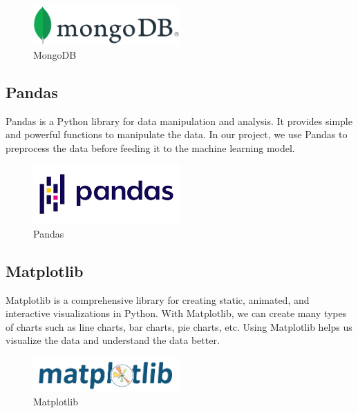 \begin{figure}[ht]
    \centering
    \includegraphics[width=0.5\textwidth]{../Images/8.Technology_Stack/mongodb_logo.png}
    \caption{MongoDB}
    \label{fig:mongodb}
\end{figure}


\subsection{Pandas}
Pandas is a Python library for data manipulation and analysis. It provides simple and powerful functions to manipulate the data. In our project, we use Pandas to preprocess the data before feeding it to the machine learning model.

\begin{figure}[ht]
    \centering
    \includegraphics[width=0.5\textwidth]{../Images/8.Technology_Stack/pandas_logo.png}
    \caption{Pandas}
    \label{fig:pandas} 
\end{figure}

\subsection{Matplotlib}
Matplotlib is a comprehensive library for creating static, animated, and interactive visualizations in Python. With Matplotlib, we can create many types of charts such as line charts, bar charts, pie charts, etc. Using Matplotlib helps us visualize the data and understand the data better.

\begin{figure}[ht]
    \centering
    \includegraphics[width=0.5\textwidth]{../Images/8.Technology_Stack/matplotlib_logo.png}
    \caption{Matplotlib}
    \label{fig:matplotlib}
\end{figure}

